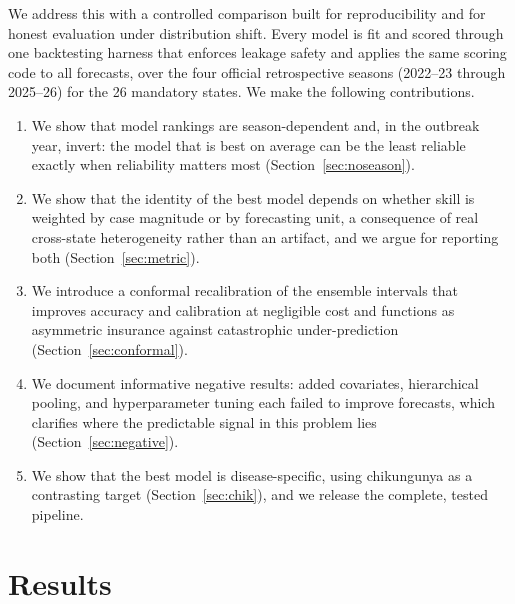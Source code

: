 \documentclass[11pt]{article}
\begin{document}
We address this with a controlled comparison built for reproducibility and for honest evaluation
under distribution shift. Every model is fit and scored through one backtesting harness that
enforces leakage safety and applies the same scoring code to all forecasts, over the four official
retrospective seasons (2022--23 through 2025--26) for the 26 mandatory states. We make the following
contributions.

\begin{enumerate}
\item We show that model rankings are season-dependent and, in the outbreak year, invert: the model
that is best on average can be the least reliable exactly when reliability matters most
(Section~\ref{sec:noseason}).
\item We show that the identity of the best model depends on whether skill is weighted by case
magnitude or by forecasting unit, a consequence of real cross-state heterogeneity rather than an
artifact, and we argue for reporting both (Section~\ref{sec:metric}).
\item We introduce a conformal recalibration of the ensemble intervals that improves accuracy and
calibration at negligible cost and functions as asymmetric insurance against catastrophic
under-prediction (Section~\ref{sec:conformal}).
\item We document informative negative results: added covariates, hierarchical pooling, and
hyperparameter tuning each failed to improve forecasts, which clarifies where the predictable signal
in this problem lies (Section~\ref{sec:negative}).
\item We show that the best model is disease-specific, using chikungunya as a contrasting target
(Section~\ref{sec:chik}), and we release the complete, tested pipeline.
\end{enumerate}

\section{Results}
\end{document}
